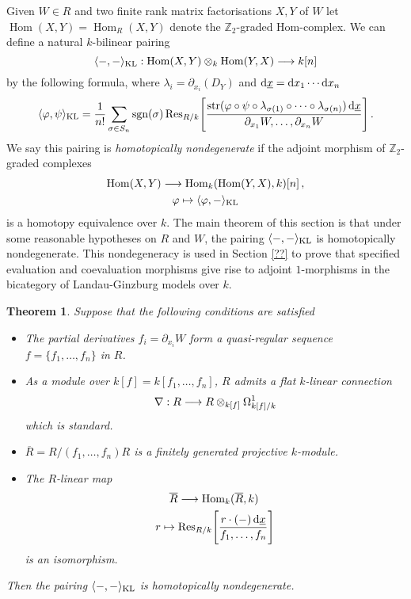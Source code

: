 \documentclass{compositio}
\newtheorem{theorem}{Theorem}[section]
\theoremstyle{definition}
\numberwithin{equation}{section}
\newcommand{\Ress}[1]{\res_{#1}\!}
\def\res{\operatorname{Res}}
\def\sgn{\operatorname{sgn}}
\def\Hom{\operatorname{Hom}}
\DeclareMathOperator{\str}{str}
\begin{document}
Given $W \in R$ and two finite rank matrix factorisations $X,Y$ of $W$ let $\Hom(X,Y) = \Hom_R(X,Y)$ denote the $\mathbb{Z}_2$-graded Hom-complex. We can define a natural $k$-bilinear pairing
\[
\langle -, - \rangle_{\textup{KL}}: \Hom(X,Y) \otimes_k \Hom(Y,X) \lto k[n]
\]
by the following formula, where $\lambda_i = \partial_{x_i}(D_Y)$ and $\mathrm{d} \underline{x} = \mathrm{d} x_1 \cdots \mathrm{d} x_n$
\[
\langle \varphi, \psi \rangle_{\textup{KL}} = \frac{1}{n!} \sum_{\sigma \in S_n} \sgn(\sigma) \Ress{R/k}\Bigg[ \frac{ \str( \varphi \circ \psi \circ \lambda_{\sigma(1)} \circ \cdots \circ \lambda_{\sigma(n)} )\, \ud \underline{x} }{ \partial_{x_1} W, \ldots, \partial_{x_n} W } \Bigg]\,.
\]
We say this pairing is \emph{homotopically nondegenerate} if the adjoint morphism of $\mathbb{Z}_2$-graded complexes
\begin{gather*}
\Hom(X,Y) \lto \Hom_k( \Hom(Y,X), k )[n]\,,\\
\varphi \mapsto \langle \varphi, - \rangle_{\textup{KL}}
\end{gather*}
is a homotopy equivalence over $k$. The main theorem of this section is that under some reasonable hypotheses on $R$ and $W$, the pairing $\langle -, - \rangle_{\textup{KL}}$ is homotopically nondegenerate. This nondegeneracy is used in Section \ref{??} to prove that specified evaluation and coevaluation morphisms give rise to adjoint $1$-morphisms in the bicategory of Landau-Ginzburg models over $k$.

\begin{theorem}\label{theorem:generalkl} Suppose that the following conditions are satisfied
\begin{itemize}
\item[(H1)] The partial derivatives $f_i = \partial_{x_i} W$ form a quasi-regular sequence $f = \{f_1,\ldots,f_n\}$ in $R$.
\item[(H2)] As a module over $k[f] = k[f_1,\ldots,f_n]$, $R$ admits a flat $k$-linear connection
\[
\nabla: R \longrightarrow R \otimes_{k[f]} \Omega^1_{k[f]/k}
\]
which is standard.
\item[(H3)] $\overline{R} = R/(f_1,\ldots,f_n)R$ is a finitely generated projective $k$-module.
\item[(H4)] The $R$-linear map
\begin{gather*}
\overline{R} \lto \Hom_k( \overline{R}, k)\,\\
r \mapsto \Ress{R/k}\Bigg[ \frac{r \cdot (-) \, \ud \underline{x}}{ f_1, \ldots, f_n} \Bigg]
\end{gather*}
is an isomorphism.
\end{itemize}
Then the pairing $\langle -, - \rangle_{\textup{KL}}$ is homotopically nondegenerate.
\end{theorem}
\end{document}
